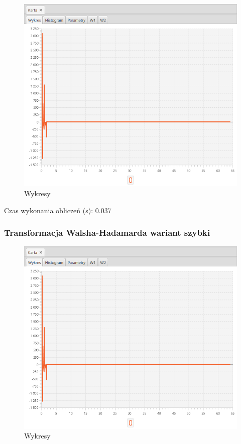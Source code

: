 \documentclass[12pt]{article}
\begin{document}
{{{                \begin{figure}[H]
                    \centering
                    \includegraphics[width=\textwidth]{img/result/s2/06/data_draw_6_sinus_sampling_trans_s2_data_205829.png}
                    \caption{Wykresy}
                \end{figure}

                Czas wykonania obliczeń (s): 0.037
            }
            \newpage

            \subsubsection{Transformacja Walsha-Hadamarda wariant szybki} {

                \begin{figure}[H]
                    \centering
                    \includegraphics[width=\textwidth]{img/result/s2/07/data_draw_7_sinus_sampling_trans_s2_data_205838.png}
                    \caption{Wykresy}
                \end{figure}

}}}
\end{document}
